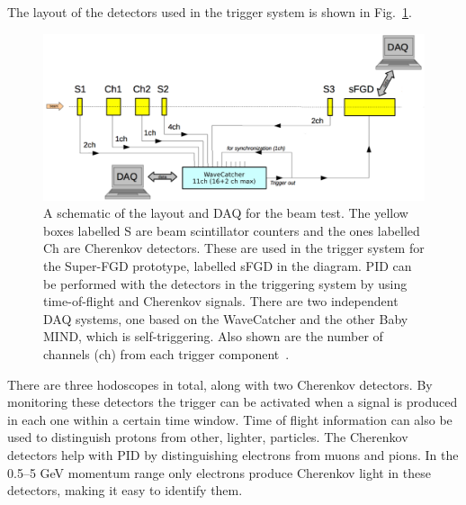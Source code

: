 \documentclass[aps,pra,12pt,notitlepage,tightenlines]{revtex4-1}
\begin{document}
The layout of the detectors used in the trigger system is shown in Fig.\ \ref{fig:daq}.
\begin{figure}
 \includegraphics[trim={1px 1px 1px 2px}, clip, scale=0.55]{daq2}
 \caption{A schematic of the layout and DAQ for the beam test. The yellow boxes labelled S are beam scintillator counters and the ones labelled Ch are Cherenkov detectors. These are used in the trigger system for the Super-FGD prototype, labelled sFGD in the diagram. PID can be performed with the detectors in the triggering system by using time-of-flight and Cherenkov signals. There are two independent DAQ systems, one based on the WaveCatcher and the other Baby MIND, which is self-triggering. Also shown are the number of channels (ch) from each trigger component~\cite{Korzenev2018}.}
 \label{fig:daq}
\end{figure}
There are three hodoscopes in total, along with two Cherenkov detectors. By monitoring these detectors the trigger can be activated when a signal is produced in each one within a certain time window. Time of flight information can also be used to distinguish protons from other, lighter, particles. The Cherenkov detectors help with PID by distinguishing electrons from muons and pions. In the 0.5--5 GeV momentum range only electrons produce Cherenkov light in these detectors, making it easy to identify them.
\end{document}
